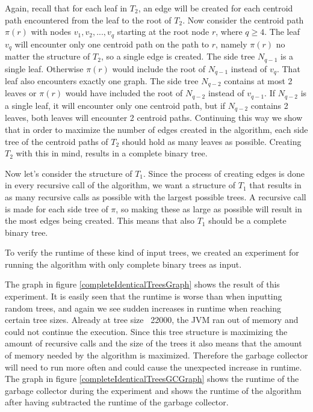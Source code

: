 Again, recall that for each leaf in $T_2$, an edge will be created for each centroid path encountered from the leaf to the root of $T_2$. Now consider the centroid path $\pi(r)$ with nodes $v_1, v_2, ..., v_q$ starting at the root node $r$, where $q \ge 4$. The leaf $v_q$ will encounter only one centroid path on the path to $r$, namely $\pi(r)$ no matter the structure of $T_2$, so a single edge is created. The side tree $N_{q-1}$ is a single leaf. Otherwise $\pi(r)$ would include the root of $N_{q-1}$ instead of $v_q$. That leaf also encounters exactly one graph. The side tree $N_{q-2}$ contains at most 2 leaves or $\pi(r)$ would have included the root of $N_{q-2}$ instead of $v_{q-1}$. If $N_{q-2}$ is a single leaf, it will encounter only one centroid path, but if $N_{q-2}$ contains 2 leaves, both leaves will encounter 2 centroid paths. Continuing this way we show that in order to maximize the number of edges created in the algorithm, each side tree of the centroid paths of $T_2$ should hold as many leaves as possible. Creating $T_2$ with this in mind, results in a complete binary tree.

Now let's consider the structure of $T_1$. Since the process of creating edges is done in every recursive call of the algorithm, we want a structure of $T_1$ that results in as many recursive calls as possible with the largest possible trees. A recursive call is made for each side tree of $\pi$, so making these as large as possible will result in the most edges being created. This means that also $T_1$ should be a complete binary tree.

To verify the runtime of these kind of input trees, we created an experiment for running the algorithm with only complete binary trees as input. 

The graph in figure \ref{completeIdenticalTreesGraph} shows the result of this experiment. It is easily seen that the runtime is worse than when inputting random trees, and again we see sudden increases in runtime when reaching certain tree sizes. Already at tree size ~22000, the JVM ran out of memory and could not continue the execution. Since this tree structure is maximizing the amount of recursive calls and the size of the trees it also means that the amount of memory needed by the algorithm is maximized. Therefore the garbage collector will need to run more often and could cause the unexpected increase in runtime. The graph in figure \ref{completeIdenticalTreesGCGraph} shows the runtime of the garbage collector during the experiment and  shows the runtime of the algorithm after having subtracted the runtime of the garbage collector. 

